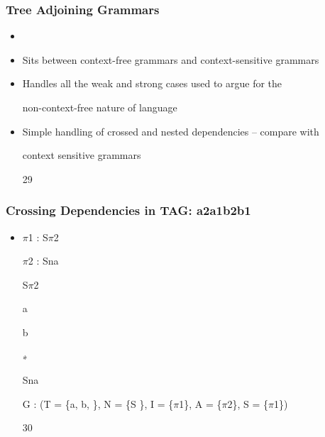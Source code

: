 \documentclass[compress,color=usenames]{beamer}
\begin{document}
\begin{frame}
\frametitle{Tree Adjoining Grammars}

\begin{itemize}
\item




\item Sits between context-free grammars and context-sensitive grammars





\item Handles all the weak and strong cases used to argue for the


non-context-free nature of language





\item Simple handling of crossed and nested dependencies -- compare with


context sensitive grammars





29




\end{itemize}

\end{frame}

\begin{frame}
\frametitle{Crossing Dependencies in TAG: a2a1b2b1}

\begin{itemize}
\item




$\pi$1 : S$\pi$2





$\pi$2 : Sna


S$\pi$2


a





b





∗


Sna





G : (T = \{a, b, \}, N = \{S \}, I = \{$\pi$1\}, A = \{$\pi$2\}, S = \{$\pi$1\})





30




\end{itemize}

\end{frame}
\end{document}
